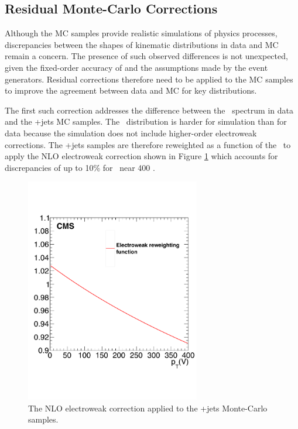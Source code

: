 \subsection{Residual Monte-Carlo Corrections} \label{mccorrections}

Although the MC samples provide realistic simulations of physics processes, discrepancies between the shapes of kinematic distributions in data and MC remain a concern. The presence of such observed differences is not unexpected, given the fixed-order accuracy of and the assumptions made by the event generators. Residual corrections therefore need to be applied to the MC samples to improve the agreement between data and MC for key distributions.

The first such correction addresses the difference between the \pTV\ spectrum in data and the \bosV+jets MC samples. The \pTV\ distribution is harder for simulation than for data because the simulation does not include higher-order electroweak corrections.\cite{EWKCORR} The \bosV+jets samples are therefore reweighted as a function of the \pTV\ to apply the NLO electroweak correction shown in Figure \ref{fig:vjetsewkweight} which accounts for discrepancies of up to 10\% for \pTV\ near 400 \GeV.

\begin{figure}[htbp]
  \centering
    \includegraphics[width=3in]{images/ewk_vjets_correction}
    \caption[2017 \bosV+jets MC Electroweak Correction]{The NLO electroweak correction applied to the \bosV+jets Monte-Carlo samples.}
    \label{fig:vjetsewkweight}
\end{figure}

